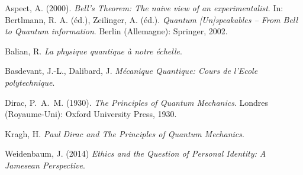 \begin{thebibliography}{99}

 Aspect, A. (2000). \textit{Bell's Theorem: The naive view of an experimentalist}. In: Bertlmann, R. A. (éd.), Zeilinger, A. (éd.). \textit{Quantum [Un]speakables – From Bell to Quantum information}. Berlin (Allemagne): Springer, 2002.

 Balian, R. \textit{La physique quantique à notre échelle}.

 Basdevant, J.-L., Dalibard, J. \textit{Mécanique Quantique: Cours de l'Ecole polytechnique}.

 Dirac, P.~A.~M. (1930). \textit{The Principles of Quantum Mechanics}. Londres (Royaume-Uni): Oxford University Press, 1930.

 Kragh, H. \textit{Paul Dirac and The Principles of Quantum Mechanics}.

 Weidenbaum, J. (2014) \textit{Ethics and the Question of Personal Identity: A Jamesean Perspective}.

\end{thebibliography}
